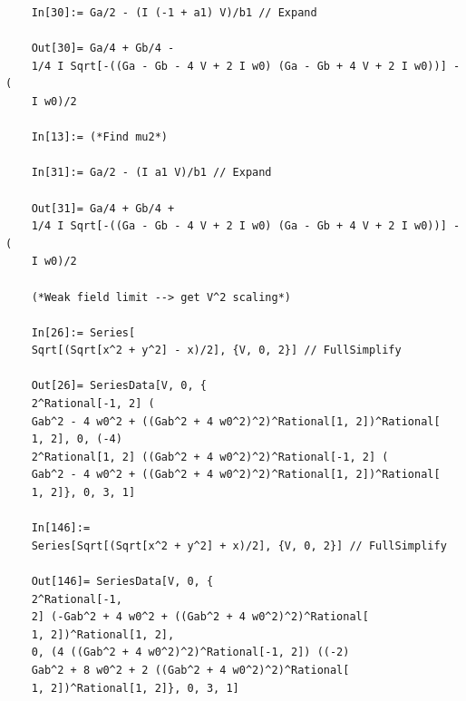 \documentclass{article}
\theoremstyle{definition}
\begin{document}
\begin{enumerate}[label=(\alph*)]
\begin{lstlisting}
	In[30]:= Ga/2 - (I (-1 + a1) V)/b1 // Expand
	
	Out[30]= Ga/4 + Gb/4 - 
	1/4 I Sqrt[-((Ga - Gb - 4 V + 2 I w0) (Ga - Gb + 4 V + 2 I w0))] - (
	I w0)/2
	
	In[13]:= (*Find mu2*)
	
	In[31]:= Ga/2 - (I a1 V)/b1 // Expand
	
	Out[31]= Ga/4 + Gb/4 + 
	1/4 I Sqrt[-((Ga - Gb - 4 V + 2 I w0) (Ga - Gb + 4 V + 2 I w0))] - (
	I w0)/2
	
	(*Weak field limit --> get V^2 scaling*)
	
	In[26]:= Series[
	Sqrt[(Sqrt[x^2 + y^2] - x)/2], {V, 0, 2}] // FullSimplify
	
	Out[26]= SeriesData[V, 0, {
	2^Rational[-1, 2] (
	Gab^2 - 4 w0^2 + ((Gab^2 + 4 w0^2)^2)^Rational[1, 2])^Rational[
	1, 2], 0, (-4)
	2^Rational[1, 2] ((Gab^2 + 4 w0^2)^2)^Rational[-1, 2] (
	Gab^2 - 4 w0^2 + ((Gab^2 + 4 w0^2)^2)^Rational[1, 2])^Rational[
	1, 2]}, 0, 3, 1]
	
	In[146]:= 
	Series[Sqrt[(Sqrt[x^2 + y^2] + x)/2], {V, 0, 2}] // FullSimplify
	
	Out[146]= SeriesData[V, 0, {
	2^Rational[-1, 
	2] (-Gab^2 + 4 w0^2 + ((Gab^2 + 4 w0^2)^2)^Rational[
	1, 2])^Rational[1, 2], 
	0, (4 ((Gab^2 + 4 w0^2)^2)^Rational[-1, 2]) ((-2)
	Gab^2 + 8 w0^2 + 2 ((Gab^2 + 4 w0^2)^2)^Rational[
	1, 2])^Rational[1, 2]}, 0, 3, 1]
	\end{lstlisting}




\end{enumerate}
\end{document}
